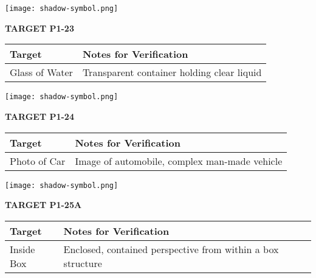 \documentclass[10pt,twoside,final]{book} %
\makeatletter
\newcommand{\cleardoublepageWithSymbol}{%
  \clearpage %
  \if@twoside %
    \ifodd\c@page %
    \else %
      \thispagestyle{fancy} %
      \begingroup %
        \vspace*{0pt} %
        \vfill %
        \centering %
        \noindent 
        \texttt{[image: shadow-symbol.png]}
        \vfill %
      \endgroup
      \newpage    %
      \if@twocolumn\if@firstcolumn\else\hbox{}\newpage\fi\fi
    \fi
  \fi
}
\makeatother
\begin{document}
\cleardoublepageWithSymbol
\label{target:P1-23}
\begin{center}
\Large\textbf{TARGET P1-23}
\end{center}
\begin{mdframed}[backgroundcolor=white, linewidth=0.7pt, linecolor=rvprimary, shadow=true, shadowsize=1pt, shadowcolor=graydark!40, roundcorner=3pt]
\begin{tabular}{|p{3.5cm}|p{9cm}|}
\hline
\rowcolor{rvprimary!15}
\textbf{Target} & \textbf{Notes for Verification} \\
\hline
Glass of Water & Transparent container holding clear liquid \\
\hline
\end{tabular}
\end{mdframed}


\cleardoublepageWithSymbol
\label{target:P1-24}
\begin{center}
\Large\textbf{TARGET P1-24}
\end{center}
\begin{mdframed}[backgroundcolor=white, linewidth=0.7pt, linecolor=rvprimary, shadow=true, shadowsize=1pt, shadowcolor=graydark!40, roundcorner=3pt]
\begin{tabular}{|p{3.5cm}|p{9cm}|}
\hline
\rowcolor{rvprimary!15}
\textbf{Target} & \textbf{Notes for Verification} \\
\hline
Photo of Car & Image of automobile, complex man-made vehicle \\
\hline
\end{tabular}
\end{mdframed}


\cleardoublepageWithSymbol
\label{target:P1-25A}
\begin{center}
\Large\textbf{TARGET P1-25A}
\end{center}
\begin{mdframed}[backgroundcolor=white, linewidth=0.7pt, linecolor=rvprimary, shadow=true, shadowsize=1pt, shadowcolor=graydark!40, roundcorner=3pt]
\begin{tabular}{|p{3.5cm}|p{9cm}|}
\hline
\rowcolor{rvprimary!15}
\textbf{Target} & \textbf{Notes for Verification} \\
\hline
Inside Box & Enclosed, contained perspective from within a box structure \\
\hline
\end{tabular}
\end{mdframed}
\end{document}
